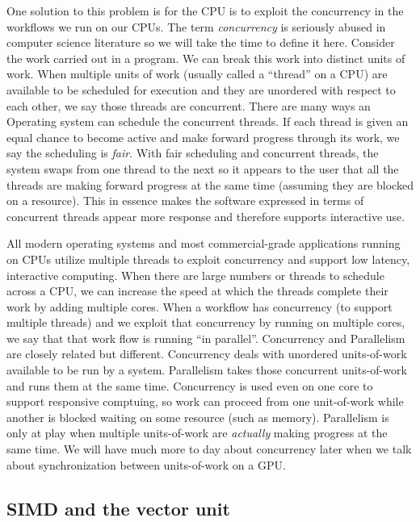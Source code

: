 One solution to this problem is for the CPU is to exploit the concurrency in the workflows we run
on our CPUs.  The term \emph{concurrency} is seriously abused in computer science literature so we will
take the time to define it here.   Consider the work carried out in a program.   We can break this work into 
distinct units of work.  When multiple units of work (usually called a ``thread'' on a CPU) are 
available to be scheduled for execution and they are unordered with respect to each other, we say those threads are concurrent.  
There are many ways an Operating system can schedule the concurrent threads.  If each thread is given an equal chance
to become active and make forward progress through its work, we say the scheduling is \emph{fair}.  With fair scheduling
and concurrent threads, the system swaps from one thread to the next so it appears to the user that all the threads
are making forward progress at the same time (assuming they are blocked on a resource).   This in essence makes the
software expressed in terms of concurrent threads appear more response and therefore supports interactive use.

All modern operating systems and most commercial-grade applications running on CPUs utilize multiple threads to
exploit concurrency and support low latency, interactive computing.  When there are large numbers
or threads to schedule across a CPU, we can increase the speed at which the threads complete their work by adding multiple 
cores.  When a workflow has concurrency (to support multiple threads) and we exploit that concurrency by running on 
multiple cores, we say that that work flow is running ``in parallel''.  Concurrency and Parallelism are closely related but 
different.  Concurrency deals with unordered units-of-work available to be run by a system.  Parallelism takes those 
concurrent units-of-work and runs them at the same time.  Concurrency is used even on one core to support 
responsive comptuing, so work can proceed from one unit-of-work while another is blocked waiting on some resource (such as 
memory).  Parallelism is only at play when multiple units-of-work are \emph{actually} making progress at the same time.  We will have 
much more to day about concurrency later when we talk about synchronization between units-of-work
on a GPU.

\subsection{SIMD and the vector unit}


